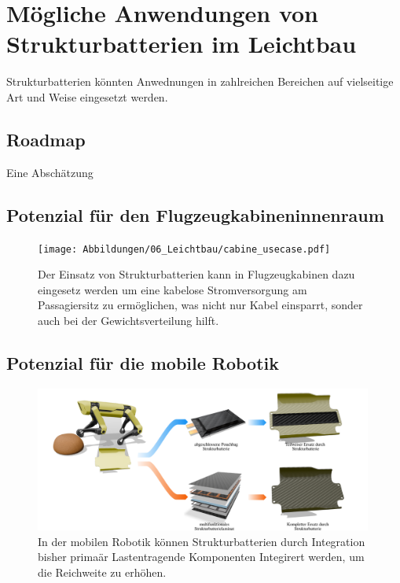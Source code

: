 \chapter{Mögliche Anwendungen von Strukturbatterien im Leichtbau}

Strukturbatterien könnten Anwednungen in zahlreichen Bereichen auf vielseitige Art und Weise eingesetzt werden. 



\section{Roadmap}
Eine Abschätzung 


\section{Potenzial für den Flugzeugkabineninnenraum}

\begin{figure}[!h]
        \center
		\texttt{[image: Abbildungen/06\_Leichtbau/cabine\_usecase.pdf]}
		\caption{\label{fig:cabin}Der Einsatz von Strukturbatterien kann in Flugzeugkabinen dazu eingesetz werden um eine kabelose Stromversorgung am Passagiersitz zu ermöglichen, was nicht nur Kabel einsparrt, sonder auch bei der Gewichtsverteilung hilft.}
\end{figure}

\section{Potenzial für die mobile Robotik}

\begin{figure}[!h]
        \center
		\includegraphics[width=0.99\textwidth, angle=0]{Abbildungen/06_Leichtbau/dog_robot_sb_study.pdf}
		\caption{\label{fig:robot_dog}In der mobilen Robotik können Strukturbatterien durch Integration bisher primaär Lastentragende Komponenten Integirert werden, um die Reichweite zu erhöhen.}
\end{figure}
